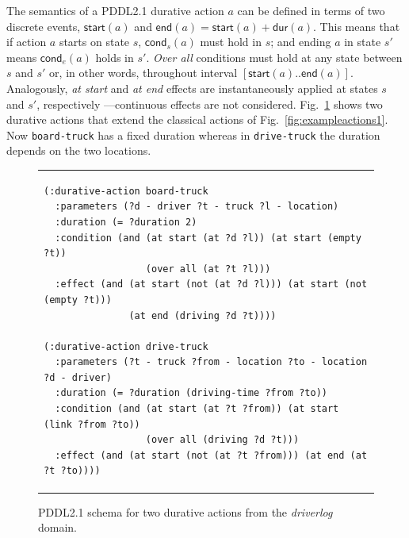 \documentclass[runningheads]{llncs}
\newcommand{\cond}{\mathsf{cond}}  %
\newcommand{\dur}{\mathsf{dur}}    %
\newcommand{\start}{\mathsf{start}}%
\newcommand{\en}{\mathsf{end}}     %
\newcommand{\til}{\mathsf{til}}    %
\begin{document}

The semantics of a PDDL2.1 durative action $a$ can be defined in terms of two discrete events, $\start(a)$ and $\en(a)=\start(a)+\dur(a)$. This means that if action $a$ starts on state $s$, $\cond_s(a)$ must hold in $s$; and ending $a$ in state $s'$ means $\cond_e(a)$ holds in $s'$. {\em Over all} conditions must hold at any state between $s$ and $s'$ or, in other words, throughout interval $[\start(a)..\en(a)]$.
Analogously, {\em at start} and {\em at end} effects are instantaneously applied at states $s$ and $s'$, respectively ---continuous effects are not considered.
Fig.~\ref{fig:exampleactions2} shows two durative actions that extend the classical actions of Fig.~\ref{fig:exampleactions1}. Now \texttt{board-truck} has a fixed duration whereas in \texttt{drive-truck} the duration depends on the two locations.

\begin{figure}
\begin{tabular}{p{\textwidth}}
\begin{verbatim}
(:durative-action board-truck
  :parameters (?d - driver ?t - truck ?l - location)
  :duration (= ?duration 2)
  :condition (and (at start (at ?d ?l)) (at start (empty ?t))
                  (over all (at ?t ?l)))
  :effect (and (at start (not (at ?d ?l))) (at start (not (empty ?t)))
               (at end (driving ?d ?t))))

(:durative-action drive-truck
  :parameters (?t - truck ?from - location ?to - location ?d - driver)
  :duration (= ?duration (driving-time ?from ?to))
  :condition (and (at start (at ?t ?from)) (at start (link ?from ?to))
                  (over all (driving ?d ?t)))
  :effect (and (at start (not (at ?t ?from))) (at end (at ?t ?to))))
\end{verbatim}
\end{tabular}
\caption{\small PDDL2.1 schema for two durative actions from the {\em driverlog} domain.}
\label{fig:exampleactions2}
\end{figure}



\end{document}
